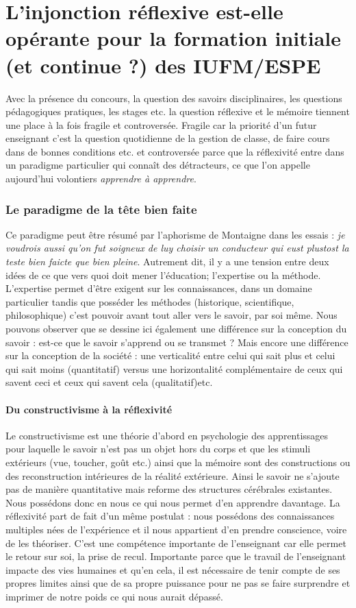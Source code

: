 \documentclass[a4paper,11pt]{article}
\begin{document}
\part{L'injonction réflexive est-elle opérante pour la formation initiale (et continue ?) des IUFM/ESPE}

Avec la présence du concours, la question des savoirs disciplinaires, les questions pédagogiques pratiques, les stages etc. la question réflexive et le mémoire tiennent une place à la fois fragile et controversée. Fragile car la priorité d'un futur enseignant c'est la question quotidienne de la gestion de classe, de faire cours dans de bonnes conditions etc. et controversée parce que la réflexivité entre dans un paradigme particulier qui connaît des détracteurs, ce que l'on appelle aujourd'hui volontiers \emph{apprendre à apprendre}.

\section{Le paradigme de la tête bien faite}
Ce paradigme peut être résumé par l'aphorisme de Montaigne dans les essais : \emph{ je voudrois aussi qu’on fut soigneux de luy choisir un conducteur qui eust plustost la teste bien faicte que bien pleine}. Autrement dit, il y a une tension entre deux idées de ce que vers quoi doit mener l'éducation; l'expertise ou la méthode. L'expertise permet d'être exigent sur les connaissances, dans un domaine particulier tandis que posséder les méthodes (historique, scientifique, philosophique) c'est pouvoir avant tout aller vers le savoir, par soi même. Nous pouvons observer que se dessine ici également une différence sur la conception du savoir : est-ce que le savoir s'apprend ou se transmet ? Mais encore une différence sur la conception de la société : une verticalité entre celui qui sait plus et celui qui sait moins (quantitatif) versus une horizontalité complémentaire de ceux qui savent ceci et ceux qui savent cela (qualitatif)etc.

			\subsection{Du constructivisme à la réflexivité}
			Le constructivisme est une théorie d'abord en psychologie des apprentissages pour laquelle le savoir n'est pas un objet hors du corps et que les stimuli extérieurs (vue, toucher, goût etc.) ainsi que la mémoire sont des constructions ou des reconstruction intérieures de la réalité extérieure. Ainsi le savoir ne s'ajoute pas de manière quantitative mais reforme des structures cérébrales existantes. Nous possédons donc en nous ce qui nous permet d'en apprendre davantage. La réflexivité part de fait d'un même postulat : nous possédons des connaissances multiples nées de l'expérience et il nous appartient d'en prendre conscience, voire de les théoriser. C'est une compétence importante de l'enseignant car elle permet le retour sur soi, la prise de recul. Importante parce que le travail de l'enseignant impacte des vies humaines et qu'en cela, il est nécessaire de tenir compte de ses propres limites ainsi que de sa propre puissance pour ne pas se faire surprendre et imprimer de notre poids ce qui nous aurait dépassé.
			
\end{document}
